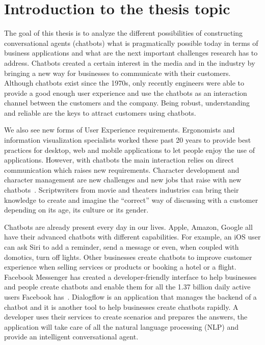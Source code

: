 
\chapter{Introduction to the thesis topic} %

\label{Chapter1} %

The goal of this thesis is to analyze the different possibilities of constructing conversational agents (chatbots) what is pragmatically possible today in terms of business applications and what are the next important challenges research has to address.
Chatbots created a certain interest in the media and in the industry by bringing a new way for businesses to communicate with their customers. Although chatbots exist since the 1970s, only recently engineers were able to provide a good enough user experience and use the chatbots as an interaction channel between the customers and the company.
Being robust, understanding and reliable are the keys to attract customers using chatbots.

We also see new forms of User Experience requirements. Ergonomists and information visualization specialists worked these past 20 years to provide best practices for desktop, web and mobile applications to let people enjoy the use of applications. However, with chatbots the main interaction relies on direct communication which raises new requirements.
Character development and character management are new challenges and new jobs that raise with new chatbots~\citep{1704.04579}.
Scriptwriters from movie and theaters industries can bring their knowledge to create and imagine the ``correct'' way of discussing with a customer depending on its age, its culture or its gender.


Chatbots are already present every day in our lives. Apple, Amazon, Google all have their advanced chatbots with different capabilities. For example, an iOS user can ask Siri to add a reminder, send a message or even, when coupled with domotics, turn off lights. Other businesses create chatbots to improve customer experience when selling services or products or booking a hotel or a flight.
Facebook Messenger has created a developer-friendly interface to help businesses and people create chatbots and enable them for all the 1.37 billion daily active users Facebook has~\citep{facebook3rdquarter2017}. Dialogflow is an application that manages the backend of a chatbot and it is another tool to help businesses create chatbots rapidly.
A developer uses their services to create scenarios and prepares the answers, the application will take care of all the natural language processing (NLP) and provide an intelligent conversational agent.

